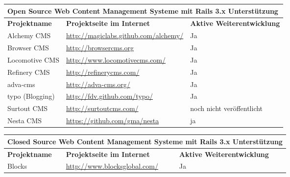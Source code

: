 
\begin{table}
\center
\begin{tabular}[]{|p{3cm}|p{8cm}|p{4cm}|}
\hline
\multicolumn{3}{|p{15cm}|}{\textbf{Open Source Web Content Management Systeme mit Rails 3.x Unterstützung}}\\
\hline
\textbf{Projektname}&\textbf{Projektseite im Internet}&\textbf{Aktive Weiterentwicklung}\\
\hline
Alchemy CMS & \href{http://magiclabs.github.com/alchemy/}{http://magiclabs.github.com/alchemy/} & Ja \\
\hline
Browser CMS & \href{http://browsercms.org}{http://browsercms.org} & Ja \\
\hline
Locomotive CMS & \href{http://www.locomotivecms.com/}{http://www.locomotivecms.com/} & Ja \\
\hline
Refinery CMS & \href{http://refinerycms.com/}{http://refinerycms.com/} & Ja \\
\hline
adva-cms & \href{http://adva-cms.org/}{http://adva-cms.org/} & Ja \\
\hline
typo (Blogging) & \href{http://fdv.github.com/typo/}{http://fdv.github.com/typo/} & Ja \\
\hline
Surtout CMS & \href{http://surtoutcms.com/}{http://surtoutcms.com/} & noch nicht veröffentlicht \\
\hline
Nesta CMS\footnotemark[1] & \href{https://github.com/gma/nesta}{https://github.com/gma/nesta} & ja  \\
\hline
\end{tabular}
\end{table}

\begin{table}
\center
\begin{tabular}[]{|p{3cm}|p{8cm}|p{4cm}|}
\hline
\multicolumn{3}{|p{15cm}|}{\textbf{Closed Source Web Content Management Systeme mit Rails 3.x Unterstützung}}\\
\hline
\textbf{Projektname}&\textbf{Projektseite im Internet}&\textbf{Aktive Weiterentwicklung}\\
\hline
Blocks & \href{http://www.blocksglobal.com/}{http://www.blocksglobal.com/} & Ja \\
\hline
\end{tabular}
\end{table}


